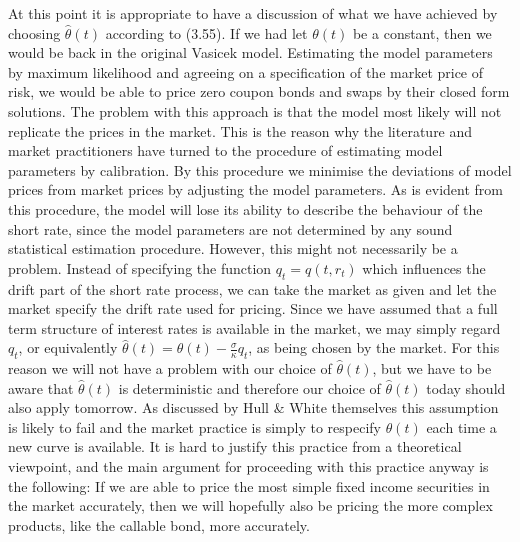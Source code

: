 \documentclass[12pt,twoside]{reedthesis}
\begin{document}
At this point it is appropriate to have a discussion of what we have achieved by choosing \(\hat{\theta}(t)\) according to (3.55). If we had let \(\theta(t)\) be a constant, then we would be back in the original Vasicek model. Estimating the model parameters by maximum likelihood and agreeing on a specification of the market price of risk, we would be able to price zero coupon bonds and swaps by their closed form solutions. The problem with this approach is that the model most likely will not replicate the prices in the market. This is the reason why the literature and market practitioners have turned to the procedure of estimating model parameters by calibration. By this procedure we minimise the deviations of model prices from market prices by adjusting the model parameters. As is evident from this procedure, the model will lose its ability to describe the behaviour of the short rate, since the model parameters are not determined by any sound statistical estimation procedure. However, this might not necessarily be a problem. Instead of specifying the function \(q_{t}=q\left(t, r_{t}\right)\) which influences the drift part of the short rate process, we can take the market as given and let the market specify the drift rate used for pricing. Since we have assumed that a full term structure of interest rates is available in the market, we may simply regard \(q_{t}\), or equivalently \(\hat{\theta}(t)=\theta(t)-\frac{\sigma}{\kappa} q_{t}\), as being chosen by the market. For this reason we will not have a problem with our choice of \(\hat{\theta}(t)\), but we have to be aware that \(\hat{\theta}(t)\) is deterministic and therefore our choice of \(\hat{\theta}(t)\) today should also apply tomorrow. As discussed by Hull \& White themselves this assumption is likely to fail and the market practice is simply to respecify \(\theta(t)\) each time a new curve is available. It is hard to justify this practice from a theoretical viewpoint, and the main argument for proceeding with this practice anyway is the following: If we are able to price the most simple fixed income securities in the market accurately, then we will hopefully also be pricing the more complex products, like the callable bond, more accurately.
\end{document}
